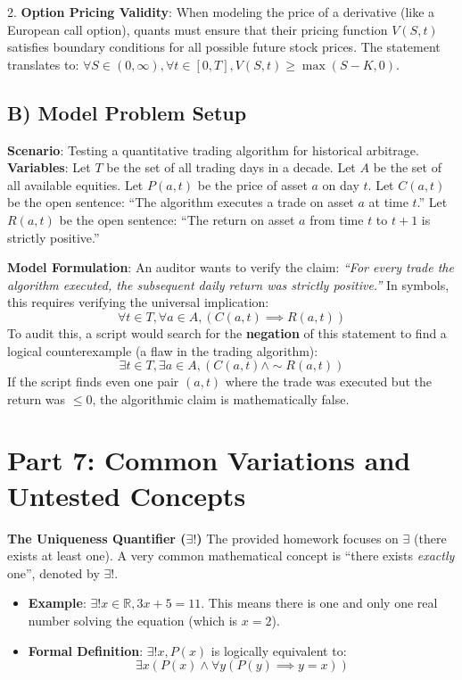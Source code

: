 \documentclass[12pt]{article}
\begin{document}
2. \textbf{Option Pricing Validity}:
When modeling the price of a derivative (like a European call option), quants must ensure that their pricing function $V(S,t)$ satisfies boundary conditions for all possible future stock prices. The statement translates to: $\forall S \in (0, \infty), \forall t \in [0, T], V(S,t) \ge \max(S-K, 0)$.

\subsection{B) Model Problem Setup}
\textbf{Scenario}: Testing a quantitative trading algorithm for historical arbitrage.
\textbf{Variables}:
Let $T$ be the set of all trading days in a decade. Let $A$ be the set of all available equities. Let $P(a, t)$ be the price of asset $a$ on day $t$.
Let $C(a, t)$ be the open sentence: ``The algorithm executes a trade on asset $a$ at time $t$.''
Let $R(a, t)$ be the open sentence: ``The return on asset $a$ from time $t$ to $t+1$ is strictly positive.''

\textbf{Model Formulation}:
An auditor wants to verify the claim: \textit{``For every trade the algorithm executed, the subsequent daily return was strictly positive.''}
In symbols, this requires verifying the universal implication:
\[ \forall t \in T, \forall a \in A, (C(a,t) \implies R(a,t)) \]
To audit this, a script would search for the \textbf{negation} of this statement to find a logical counterexample (a flaw in the trading algorithm):
\[ \exists t \in T, \exists a \in A, (C(a,t) \land \sim R(a,t)) \]
If the script finds even one pair $(a, t)$ where the trade was executed but the return was $\le 0$, the algorithmic claim is mathematically false.

\section{Part 7: Common Variations and Untested Concepts}

\textbf{The Uniqueness Quantifier ($\exists!$)}
The provided homework focuses on $\exists$ (there exists at least one). A very common mathematical concept is ``there exists \textit{exactly} one'', denoted by $\exists!$.
\begin{itemize}
    \item \textbf{Example}: $\exists! x \in \mathbb{R}, 3x + 5 = 11$. This means there is one and only one real number solving the equation (which is $x=2$).
    \item \textbf{Formal Definition}: $\exists! x, P(x)$ is logically equivalent to:
    \[ \exists x \left( P(x) \land \forall y (P(y) \implies y = x) \right) \]
\end{itemize}
\end{document}
